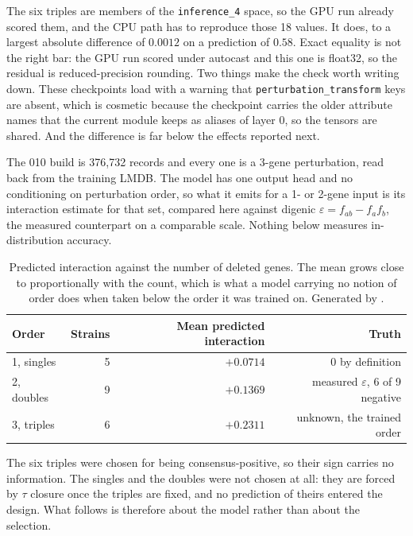  The six triples are members of
the \texttt{inference\_4} space, so the GPU run already scored them, and the CPU
path has to reproduce those 18 values. It does, to a largest absolute difference of
$0.0012$ on a prediction of $0.58$. Exact equality is not the right bar: the GPU run
scored under autocast and this one is float32, so the residual is reduced-precision
rounding. Two things make the check worth writing down. These checkpoints load with
a warning that \texttt{perturbation\_transform} keys are absent, which is cosmetic
because the checkpoint carries the older attribute names that the current module
keeps as aliases of layer 0, so the tensors are shared. And the difference is far
below the effects reported next.

 The 010 build is 376{,}732 records and
every one is a 3-gene perturbation, read back from the training LMDB. The model has
one output head and no conditioning on perturbation order, so what it emits for a
1- or 2-gene input is its interaction estimate for that set, compared here against
digenic $\varepsilon = f_{ab} - f_a f_b$, the measured counterpart on a comparable
scale. Nothing below measures in-distribution accuracy.

\begin{table}[H]
\centering
\footnotesize
\begin{tabular}{lrrr}
\toprule
Order & Strains & Mean predicted interaction & Truth \\
\midrule
1, singles & 5 & $+0.0714$ & $0$ by definition \\
2, doubles & 9 & $+0.1369$ & measured $\varepsilon$, 6 of 9 negative \\
3, triples & 6 & $+0.2311$ & unknown, the trained order \\
\bottomrule
\end{tabular}
\caption{Predicted interaction against the number of deleted genes. The mean grows
close to proportionally with the count, which is what a model carrying no notion of
order does when taken below the order it was trained on. Generated by
\protect{}.}
\end{table}

 The six triples were
chosen for being consensus-positive, so their sign carries no information. The
singles and the doubles were not chosen at all: they are forced by $\tau$ closure
once the triples are fixed, and no prediction of theirs entered the design. What
follows is therefore about the model rather than about the selection.

